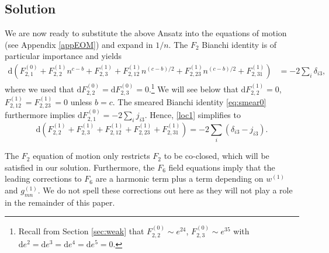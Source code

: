 \documentclass[11pt]{article}
\newcommand{\be}{\begin{equation}}
\newcommand{\ee}{\end{equation}}
\def\be{\begin{equation}}
\def\ee{\end{equation}}
\renewcommand{\[}{\left[}
\renewcommand{\]}{\right]}
\renewcommand{\(}{\left(}
\renewcommand{\)}{\right)}
\renewcommand{\d}{\textrm{d}}
\newcommand{\<}{\langle}
\renewcommand{\>}{\rangle}
\begin{document}
\subsection{Solution}

We are now ready to substitute the above Ansatz into the equations of motion (see Appendix \ref{appEOM}) and expand in $1/n$. The $F_2$ Bianchi identity is of particular importance and yields
\begin{align}
\d \left( F_{2,1}^{(0)} + F_{2,2}^{(1)}n^{c-b} + F_{2,3}^{(1)} + F_{2,12}^{(1)}n^{(c-b)/2} + F_{2,23}^{(1)}n^{(c-b)/2} +
F_{2,31}^{(1)} \right) &= - 2\sum_i \delta_{i3}, \label{loc1}
\end{align}
where we used that  $\d F_{2,2}^{(0)}=\d F_{2,3}^{(0)}=0$.\footnote{Recall from Section \ref{sec:weak} that $F_{2,2}^{(0)} \sim e^{24}$, $F_{2,3}^{(0)} \sim e^{35}$ with $\d e^2=\d e^3=\d e^4=\d e^5=0$.} 
We will see below that $\d F_{2,2}^{(1)} = 0$, $F_{2,12}^{(1)} = F_{2,23}^{(1)}=0$ unless $b=c$.
The smeared Bianchi identity \eqref{eq:smear0} furthermore implies $\d F_{2,1}^{(0)}=-2 \sum_i j_{i3}$. Hence, \eqref{loc1} simplifies to
\be \label{loc2}
\d \left(F_{2,2}^{(1)}+ F_{2,3}^{(1)} + F_{2,12}^{(1)} + F_{2,23}^{(1)}+ F_{2,31}^{(1)} \right) = -2\sum_i( \delta_{i3}- j_{i3}).
\ee

The $F_2$ equation of motion only restricts $F_2$ to be co-closed, which will be satisfied in our solution.
Furthermore, the $F_6$ field equations imply that the leading corrections to $F_6$ are a harmonic term plus a term depending on $w^{(1)}$ and $g_{mn}^{(1)}$. We do not spell these corrections out here as they will not play a role in the remainder of this paper.
\end{document}
